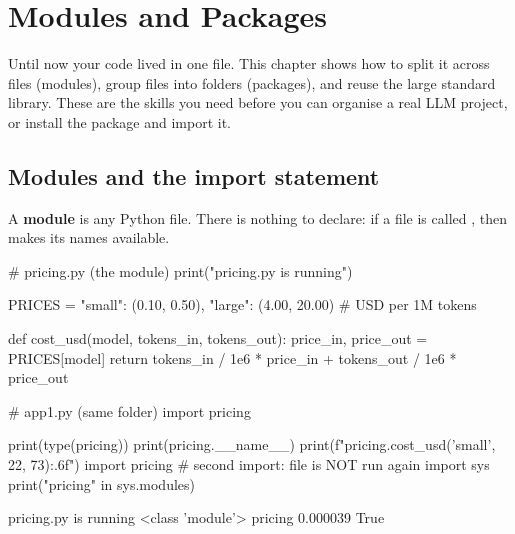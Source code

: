 \chapter{Modules and Packages}

\usetikzlibrary{shapes.geometric}
\providecommand{\tnode}[4]{\node[anchor=west,text=#4] at (#1,-#2*0.46) {\ttfamily\small #3};}

Until now your code lived in one file. This chapter shows how to split it across files
(modules), group files into folders (packages), and reuse the large standard library.
These are the skills you need before you can organise a real LLM project, or install
the  package and import it.

\section{Modules and the import statement}

A \textbf{module} is any Python file. There is nothing to declare: if a file is called
, then  makes its names available.

\begin{pycode}
# pricing.py  (the module)
print("pricing.py is running")

PRICES = {"small": (0.10, 0.50), "large": (4.00, 20.00)}  # USD per 1M tokens

def cost_usd(model, tokens_in, tokens_out):
    price_in, price_out = PRICES[model]
    return tokens_in / 1e6 * price_in + tokens_out / 1e6 * price_out
\end{pycode}

\begin{pycode}
# app1.py  (same folder)
import pricing

print(type(pricing))
print(pricing.__name__)
print(f"{pricing.cost_usd('small', 22, 73):.6f}")
import pricing           # second import: file is NOT run again
import sys
print("pricing" in sys.modules)
\end{pycode}
\begin{rawcode}
pricing.py is running
<class 'module'>
pricing
0.000039
True
\end{rawcode}

